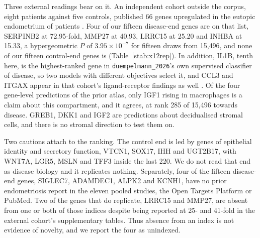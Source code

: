 Three external readings bear on it. An independent cohort outside the
corpus, eight patients against five controls, published 66 genes
upregulated in the eutopic endometrium of patients
\citep{zhao2017transcriptome}. Four of our fifteen disease-end genes are on
that list, SERPINB2 at 72.95-fold, MMP27 at 40.93, LRRC15 at 25.20 and
INHBA at 15.33, a hypergeometric $P$ of $3.95 \times 10^{-7}$ for fifteen
draws from 15{,}496, and none of our fifteen control-end genes is
(Table~\ref{stab:x12rep}). In addition, IL1B, tenth here, is the
highest-ranked gene in \texttt{duempelmann\_2026}'s own supervised
classifier of disease, so two models with different objectives select it,
and CCL3 and ITGAX appear in that cohort's ligand-receptor findings as well
\citep{duempelmann2026endometrium}. Of the four gene-level predictions of
the prior atlas, only IGF1 rising in macrophages is a claim about this
compartment, and it agrees, at rank 285 of 15{,}496 towards disease. GREB1,
DKK1 and IGF2 are predictions about decidualised stromal cells, and there
is no stromal direction to test them on.

Two cautions attach to the ranking. The control end is led by genes of
epithelial identity and secretory function, VTCN1, SOX17, IHH and UGT2B17,
with WNT7A, LGR5, MSLN and TFF3 inside the last 220. We do not read that
end as disease biology and it replicates nothing. Separately, four of the
fifteen disease-end genes, SIGLEC7, ADAMDEC1, ALPK2 and KCNH1, have no
prior endometriosis report in the eleven pooled studies, the Open Targets
Platform or PubMed. Two of the genes that do replicate, LRRC15 and MMP27,
are absent from one or both of those indices despite being reported at 25-
and 41-fold in the external cohort's supplementary tables. Thus absence
from an index is not evidence of novelty, and we report the four as
unindexed.

\begin{table}[p]
\centering
\caption[X12, the disease end of the ranking]{\textbf{The fifteen genes
moving most towards disease along the immune direction.}}
\label{stab:x12top}
\footnotesize

\end{table}

\begin{table}[p]
\centering
\caption[X12, the control end of the ranking]{\textbf{The fifteen genes
moving most towards control along the same direction.}}
\label{stab:x12bot}
\small

\end{table}

